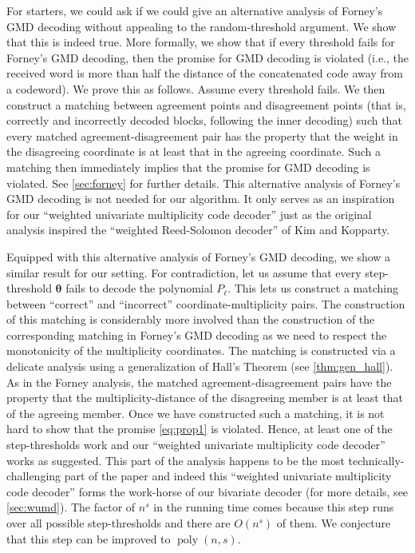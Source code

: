\documentclass{article}
\def\poly{\operatorname{poly}}
\newcommand{\thetabar}{{\boldsymbol{\theta}}}
\begin{document}
	For starters, we could ask if we could give an alternative analysis of
	Forney's GMD decoding without appealing to the random-threshold
	argument. We show that this is indeed true. More formally, we show
	that if every threshold fails for Forney's GMD decoding, then the
	promise for GMD decoding is violated (i.e., the received word is more than half the distance of the concatenated code away from a codeword). We prove this as follows. Assume
	every threshold fails. We then construct a matching between agreement
	points and disagreement points (that is, correctly and incorrectly decoded blocks, following the inner decoding) such that every matched
	agreement-disagreement pair has the property that the weight in the
	disagreeing coordinate is at least that in the agreeing
	coordinate. Such a matching then immediately implies that the promise
	for GMD decoding is violated. See \cref{sec:forney} for further
	details. This alternative analysis of Forney's GMD decoding is not
	needed for our algorithm. It only serves as an inspiration for our
	``weighted univariate multiplicity code decoder'' just as the original
	analysis inspired the ``weighted Reed-Solomon decoder'' of Kim and
	Kopparty.
	
	Equipped with this alternative analysis of Forney's GMD decoding, we
	show a similar result for our setting. For contradiction, let us
	assume that every step-threshold $\thetabar$ fails to decode the
	polynomial $P_\ell$. This lets us construct a matching between
	``correct'' and ``incorrect'' coordinate-multiplicity pairs. The
	construction of this matching is considerably more involved than the
	construction of the corresponding matching in Forney's GMD decoding as
	we need to respect the monotonicity of the multiplicity
	coordinates. The matching is constructed via a delicate analysis using
	a generalization of Hall's Theorem (see \cref{thm:gen_hall}).  As in
	the Forney analysis, the matched agreement-disagreement pairs have the
	property that the multiplicity-distance of the disagreeing member is
	at least that of the agreeing member.  Once we have constructed such a
	matching, it is not hard to show that the promise \eqref{eq:prop1} is
	violated. Hence, at least one of the step-thresholds work and our
	``weighted univariate multiplicity code decoder'' works as
	suggested. This part of the analysis happens to be the most
	technically-challenging part of the paper and indeed this ``weighted univariate
	multiplicity code decoder'' forms the work-horse of our bivariate
	decoder (for more details, see \cref{sec:wumd}). The factor of $n^s$
	in the running time comes because this step runs over all possible
	step-thresholds and there are $O(n^s)$ of them. We conjecture that
	this step can be improved to $\poly(n,s)$. 
	
\end{document}
